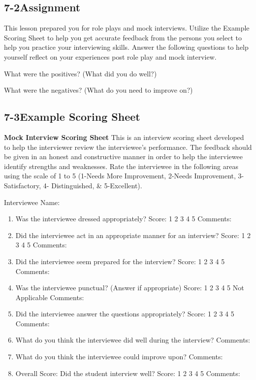 \pagebreak \subsection*{7-2\quad Assignment}
This lesson prepared you for role plays and mock interviews. Utilize the Example Scoring Sheet to help you get accurate feedback from the persons you select to help you practice your interviewing skills. Answer the following questions to help yourself reflect on your experiences post role play and mock interview.

What were the positives? (What did you do well?)

What were the negatives? (What do you need to improve on?)
 
\pagebreak \subsection*{7-3\quad Example Scoring Sheet}
\textbf{Mock Interview Scoring Sheet}
\break This is an interview scoring sheet developed to help the interviewer review the interviewee's performance. The feedback should be given in an honest and constructive manner in order to help the interviewee identify strengths and weaknesses. Rate the interviewee in the following areas using the scale of 1 to 5 (1-Needs More Improvement, 2-Needs Improvement, 3-Satisfactory, 4- Distinguished, \& 5-Excellent).
\pagebreak 

Interviewee Name: \hrulefill
\begin{enumerate}[leftmargin=*]
\item Was the interviewee dressed appropriately? 
\break Score: 1 2 3 4 5 
\break Comments:

\item Did the interviewee act in an appropriate manner for an interview? 
\break Score: 1 2 3 4 5 
\break Comments:

\item Did the interviewee seem prepared for the interview? 
\break Score: 1 2 3 4 5 
\break Comments:

\item Was the interviewee punctual? (Answer if appropriate) 
\break Score: 1 2 3 4 5 Not Applicable \break Comments:

\item Did the interviewee answer the questions appropriately? 
\break Score: 1 2 3 4 5 
\break Comments:

\item What do you think the interviewee did well during the interview? 
\break Comments:

\item What do you think the interviewee could improve upon? 
\break Comments:

\item Overall Score: Did the student interview well? 
\break Score: 1 2 3 4 5 
\break Comments:
 \end{enumerate}
 
